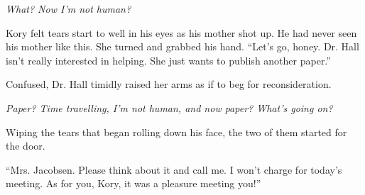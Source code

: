\textit{What? Now I'm not human?}

Kory felt tears start to well in his eyes as his mother shot up. He had never seen his mother like this. She turned and grabbed his hand. ``Let's go, honey. Dr. Hall isn't really interested in helping. She just wants to publish another paper.''

Confused, Dr. Hall timidly raised her arms as if to beg for reconsideration.

\textit{Paper? Time travelling, I'm not human, and now paper? What's going on?}

Wiping the tears that began rolling down his face, the two of them started for the door.

``Mrs. Jacobsen. Please think about it and call me. I won't charge for today's meeting. As for you, Kory, it was a pleasure meeting you!''
